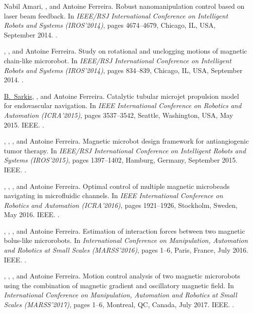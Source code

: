 \begin{Mybibliography}{10}
  Nabil Amari, \DavidFolio, and Antoine Ferreira.
  \newblock Robust nanomanipulation control based on laser beam feedback.
  \newblock In \emph{IEEE/RSJ International Conference on Intelligent Robots and
    Systems (IROS'2014)}, pages 4674--4679, Chicago, IL, USA, September
  2014{}.
  \newblock {}.
  
  \KBelharet, \DavidFolio, and Antoine Ferreira.
  \newblock Study on rotational and unclogging motions of magnetic chain-like
  microrobot.
  \newblock In \emph{IEEE/RSJ International Conference on Intelligent Robots and
    Systems (IROS'2014)}, pages 834--839, Chicago, IL, USA, September
  2014{}.
  \newblock {}.
  
  \underline{B.~Sarkis}, \DavidFolio, and Antoine Ferreira.
  \newblock Catalytic tubular microjet propulsion model for endovascular
  navigation.
  \newblock In \emph{IEEE International Conference on Robotics and Automation
    (ICRA'2015)}, pages 3537--3542, Seattle, Washington, USA, May 2015. IEEE.
  \newblock {}.
  
  \LMellal, \DavidFolio, \KBelharet, and Antoine Ferreira.
  \newblock Magnetic microbot design framework for antiangiogenic tumor therapy.
  \newblock In \emph{IEEE/RSJ International Conference on Intelligent Robots and
    Systems (IROS'2015)}, pages 1397--1402, Hamburg, Germany, September
  2015{}. IEEE.
  \newblock {}.
  
  \LMellal, \DavidFolio, \KBelharet, and Antoine Ferreira.
  \newblock Optimal control of multiple magnetic microbeads navigating in
  microfluidic channels.
  \newblock In \emph{IEEE International Conference on Robotics and Automation
    (ICRA'2016)}, pages 1921--1926, Stockholm, Sweden, May 2016{}.
  IEEE.
  \newblock {}.
  
  \LMellal, \DavidFolio, \KBelharet, and Antoine Ferreira.
  \newblock Estimation of interaction forces between two magnetic bolus-like
  microrobots.
  \newblock In \emph{International Conference on Manipulation, Automation and
    Robotics at Small Scales (MARSS'2016)}, pages 1--6, Paris, France, July
  2016{}. IEEE.
  \newblock {}.
  
  \LMellal, \DavidFolio, \KBelharet, and Antoine Ferreira.
  \newblock Motion control analysis of two magnetic microrobots using the
  combination of magnetic gradient and oscillatory magnetic field.
  \newblock In \emph{International Conference on Manipulation, Automation and
    Robotics at Small Scales (MARSS'2017)}, pages 1--6, Montreal, QC, Canada,
  July 2017. IEEE.
  \newblock {}.
  
\end{Mybibliography}



